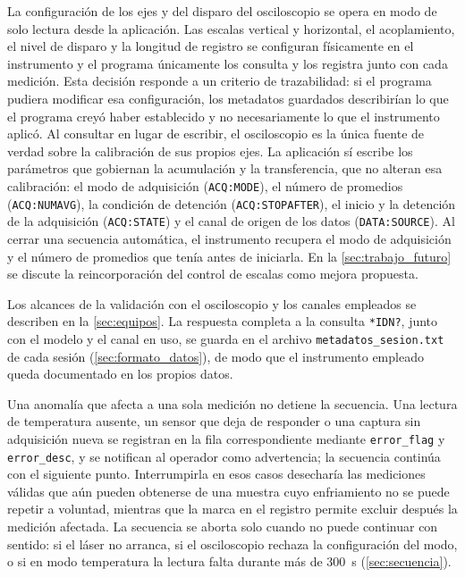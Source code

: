 La configuración de los ejes y del disparo del osciloscopio se opera en
modo de solo lectura desde la aplicación. Las escalas vertical y
horizontal, el acoplamiento, el nivel de disparo y la longitud de
registro se configuran físicamente en el instrumento y el programa
únicamente los consulta y los registra junto con cada medición. Esta
decisión responde a un criterio de trazabilidad: si el programa pudiera
modificar esa configuración, los metadatos guardados describirían lo
que el programa creyó haber establecido y no necesariamente lo que el
instrumento aplicó. Al consultar en lugar de escribir, el osciloscopio
es la única fuente de verdad sobre la calibración de sus propios ejes.
La aplicación sí escribe los parámetros que gobiernan la acumulación y
la transferencia, que no alteran esa calibración: el modo de
adquisición (\texttt{ACQ:MODE}), el número de promedios
(\texttt{ACQ:NUMAVG}), la condición de detención
(\texttt{ACQ:STOPAFTER}), el inicio y la detención de la adquisición
(\texttt{ACQ:STATE}) y el canal de origen de los datos
(\texttt{DATA:SOURCE}). Al cerrar una secuencia automática, el
instrumento recupera el modo de adquisición y el número de promedios
que tenía antes de iniciarla. En la \cref{sec:trabajo_futuro} se
discute la reincorporación del control de escalas como mejora
propuesta.

Los alcances de la validación con el osciloscopio y los canales
empleados se describen en la \cref{sec:equipos}. La respuesta completa a la consulta
\texttt{*IDN?}, junto con el modelo y el canal en uso, se guarda en el
archivo \texttt{metadatos\_sesion.txt} de cada sesión
(\cref{sec:formato_datos}), de modo que el instrumento empleado queda
documentado en los propios datos.

Una anomalía que afecta a una sola medición no detiene la secuencia.
Una lectura de temperatura ausente, un sensor que deja de responder o
una captura sin adquisición nueva se registran en la fila
correspondiente mediante \texttt{error\_flag} y \texttt{error\_desc},
y se notifican al operador como advertencia; la secuencia continúa con
el siguiente punto. Interrumpirla en esos casos desecharía las
mediciones válidas que aún pueden obtenerse de una muestra cuyo
enfriamiento no se puede repetir a voluntad, mientras que la marca en
el registro permite excluir después la medición afectada. La secuencia
se aborta solo cuando no puede continuar con sentido: si el láser no
arranca, si el osciloscopio rechaza la configuración del modo, o si en
modo temperatura la lectura falta durante más de \SI{300}{\second}
(\cref{sec:secuencia}).


